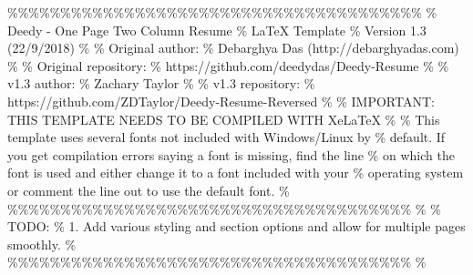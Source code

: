 \documentclass{article}%
\begin{document}
%
\normalsize%
\newline%
\%\%\%\%\%\%\%\%\%\%\%\%\%\%\%\%\%\%\%\%\%\%\%\%\%\%\%\%\%\%\%\%\%\%\%\%\%\%\%\newline%
\% Deedy {-} One Page Two Column Resume\newline%
\% LaTeX Template\newline%
\% Version 1.3 (22/9/2018)\newline%
\%\newline%
\% Original author:\newline%
\% Debarghya Das (http://debarghyadas.com)\newline%
\%\newline%
\% Original repository:\newline%
\% https://github.com/deedydas/Deedy{-}Resume\newline%
\%\newline%
\% v1.3 author:\newline%
\% Zachary Taylor\newline%
\%\newline%
\% v1.3 repository:\newline%
\% https://github.com/ZDTaylor/Deedy{-}Resume{-}Reversed\newline%
\%\newline%
\% IMPORTANT: THIS TEMPLATE NEEDS TO BE COMPILED WITH XeLaTeX\newline%
\%\newline%
\% This template uses several fonts not included with Windows/Linux by\newline%
\% default. If you get compilation errors saying a font is missing, find the line\newline%
\% on which the font is used and either change it to a font included with your\newline%
\% operating system or comment the line out to use the default font.\newline%
\%\newline%
\%\%\%\%\%\%\%\%\%\%\%\%\%\%\%\%\%\%\%\%\%\%\%\%\%\%\%\%\%\%\%\%\%\%\%\%\%\%\newline%
\%\newline%
\% TODO:\newline%
\% 1. Add various styling and section options and allow for multiple pages smoothly.\newline%
\%\newline%
\%\%\%\%\%\%\%\%\%\%\%\%\%\%\%\%\%\%\%\%\%\%\%\%\%\%\%\%\%\%\%\%\%\%\%\%\%\%\newline%
\%\newline%
\end{document}

